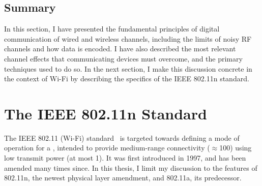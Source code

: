 




\subsection{Summary}
In this section, I have presented the fundamental principles of digital communication of wired and wireless channels, including the limits of noisy RF channels and how data is encoded. I have also described the most relevant channel effects that communicating devices must overcome, and the primary techniques used to do so. In the next section, I make this discussion concrete in the context of Wi-Fi by describing the specifics of the IEEE 802.11n standard. 

\section{The IEEE 802.11n Standard}
\label{sec:background_80211n}
The IEEE 802.11 (Wi-Fi) standard~\cite{80211} is targeted towards defining a mode of operation for a , intended to provide medium-range connectivity ($\approx$100\m) using low transmit power (at most 1\W). It was first introduced in 1997, and has been amended many times since. In this thesis, I limit my discussion to the features of 802.11n, the newest physical layer amendment, and 802.11a, its predecessor.

